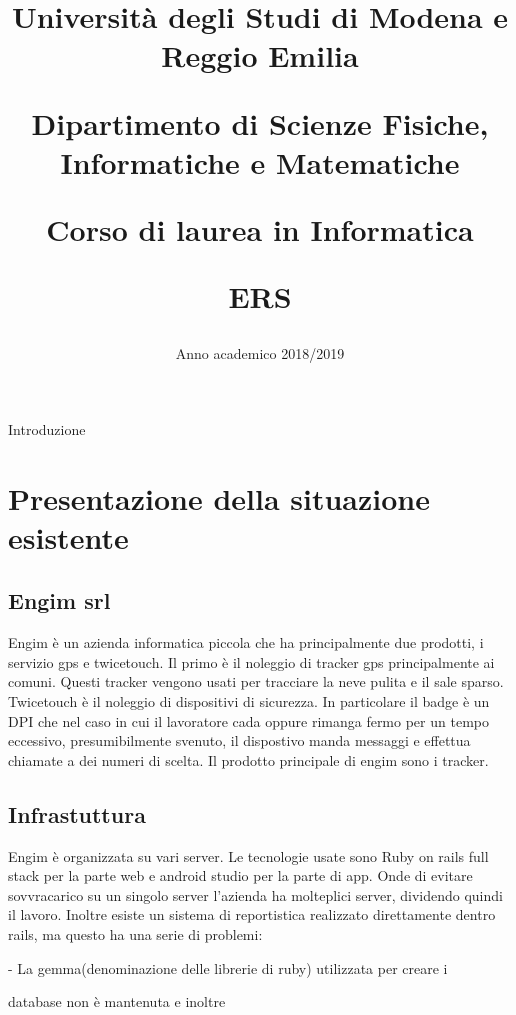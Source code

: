 \documentclass[12pt]{article}
\author{}
\title{
    \huge 
        \textbf{Università degli Studi di Modena e Reggio Emilia}
    \large
        \par Dipartimento di Scienze Fisiche, Informatiche e Matematiche
        \par Corso di laurea in Informatica
    \vfil
        \huge \par \textbf{ERS}
    \vfil
}
\date{Anno academico 2018/2019}
\begin{document}
\maketitle
\par Introduzione
\par 
\section{Presentazione della situazione esistente}
\subsection{Engim srl}
Engim è un azienda informatica piccola che ha principalmente due prodotti, i
servizio gps e twicetouch. Il primo è il noleggio di tracker gps principalmente 
ai comuni. Questi tracker vengono usati per tracciare la neve pulita e il 
sale sparso. Twicetouch è il noleggio di dispositivi di sicurezza. In particolare 
il badge è un DPI che nel caso in cui il lavoratore cada oppure rimanga fermo 
per un tempo eccessivo, presumibilmente svenuto, il dispostivo manda messaggi 
e effettua chiamate a dei numeri di scelta. 
Il prodotto principale di engim sono i tracker.
\subsection{Infrastuttura}
Engim è organizzata su vari server. Le tecnologie usate sono Ruby on rails full
stack per la parte web e android studio per la parte di app. Onde di evitare 
sovvracarico su un singolo server l'azienda ha molteplici server, dividendo 
quindi il lavoro. Inoltre esiste un sistema di reportistica realizzato direttamente
dentro rails, ma questo ha una serie di problemi:

- La gemma(denominazione delle librerie di ruby) utilizzata per creare i

database non è mantenuta e inoltre 
\end{document}
